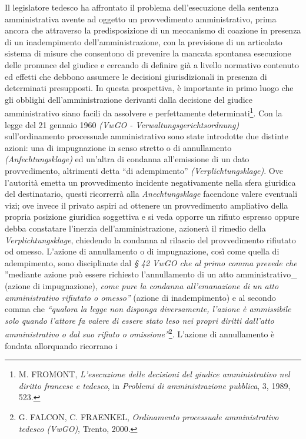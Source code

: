 \documentclass[12pt,it,a4paper,]{report}
\begin{document}
Il legislatore tedesco ha affrontato il problema dell'esecuzione della
sentenza amministrativa avente ad oggetto un provvedimento
amministrativo, prima ancora che attraverso la predisposizione di un
meccanismo di coazione in presenza di un inadempimento
dell'amministrazione, con la previsione di un articolato sistema di
misure che consentono di prevenire la mancata spontanea esecuzione delle
pronunce del giudice e cercando di definire già a livello normativo
contenuto ed effetti che debbono assumere le decisioni giurisdizionali
in presenza di determinati presupposti. In questa prospettiva, è
importante in primo luogo che gli obblighi dell'amministrazione
derivanti dalla decisione del giudice amministrativo siano facili da
assolvere e perfettamente determinati\footnote{M. FROMONT,
  \emph{L'esecuzione delle decisioni del giudice amministrativo nel
  diritto francese e tedesco}, in \emph{Problemi di amministrazione
  pubblica}, 3, 1989, 523.}. Con la legge del 21 gennaio 1960
\emph{(VwGO - Verwaltungsgerichtsordnung)} sull'ordinamento processuale
amministrativo sono state introdotte due distinte azioni: una di
impugnazione in senso stretto o di annullamento
\emph{(Anfechtungsklage)} ed un'altra di condanna all'emissione di un
dato provvedimento, altrimenti detta ``di adempimento''
\emph{(Verplichtungsklage)}. Ove l'autorità emetta un provvedimento
incidente negativamente nella sfera giuridica del destinatario, questi
ricorrerrà alla \emph{Anechtungsklage} facendone valere eventuali vizi;
ove invece il privato aspiri ad ottenere un provvedimento ampliativo
della propria posizione giuridica soggettiva e si veda opporre un
rifiuto espresso oppure debba constatare l'inerzia dell'amministrazione,
azionerà il rimedio della \emph{Verplichtungsklage}, chiedendo la
condanna al rilascio del provvedimento rifiutato od omesso. L'azione di
annullamento o di impugnazione, così come quella di adempimento, sono
disciplinate dal \emph{§ 42 \emph{VwGO} che al primo comma prevede che
}''mediante azione può essere richiesto l'annullamento di un atto
amministrativo\_ (azione di impugnazione), \emph{come pure la condanna
all'emanazione di un atto amministrativo rifiutato o omesso''} (azione
di inadempimento) e al secondo comma che \emph{``qualora la legge non
disponga diversamente, l'azione è ammissibile solo quando l'attore fa
valere di essere stato leso nei propri diritti dall'atto amministrativo
o dal suo rifiuto o omissione''}\footnote{G. FALCON, C. FRAENKEL,
  \emph{Ordinamento processuale amministrativo tedesco (VwGO)}, Trento,
  2000.}. L'azione di annullamento è fondata allorquando ricorrano i
\end{document}
